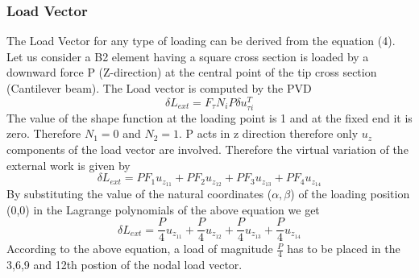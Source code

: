 \documentclass[a4paper,12pt]{article}
\begin{document}
\subsubsection*{Load Vector}
\indent\indent\indent The Load Vector for any type of loading can be derived from the equation (4). Let us consider a B2 element having a square cross section is loaded by a downward force P (Z-direction) at the central point of the tip cross section (Cantilever beam). The Load vector is computed by the PVD
\begin{equation}
\delta L_{ext} = F_{\tau}N_{i}P\delta u^{T}_{\tau i}
\label{PVD}
\end{equation}
The value of the shape function at the loading point is 1 and at the fixed end it is zero. Therefore $N_{1} = 0$ and $N_{2} = 1$. P acts in z direction therefore only $u_{z}$ components of the load vector are involved. Therefore the virtual variation of the external work is given by
$$
\delta L_{ext} = P F_{1} u_{z_{11}} + P F_{2} u_{z_{12}} + P F_{3} u_{z_{13}} + P F_{4} u_{z_{14}}
$$
By substituting the value of the natural coordinates ($\alpha,\beta$) of the loading position (0,0) in the Lagrange polynomials of the above equation we get
$$
\delta L_{ext} = \frac{P}{4} u_{z_{11}} + \frac{P}{4} u_{z_{12}} + \frac{P}{4} u_{z_{13}} + \frac{P}{4} u_{z_{14}} 
$$
According to the above equation, a load of magnitude $\frac{P}{4}$ has to be placed in the 3,6,9 and 12th postion of the nodal load vector. 
\end{document}
